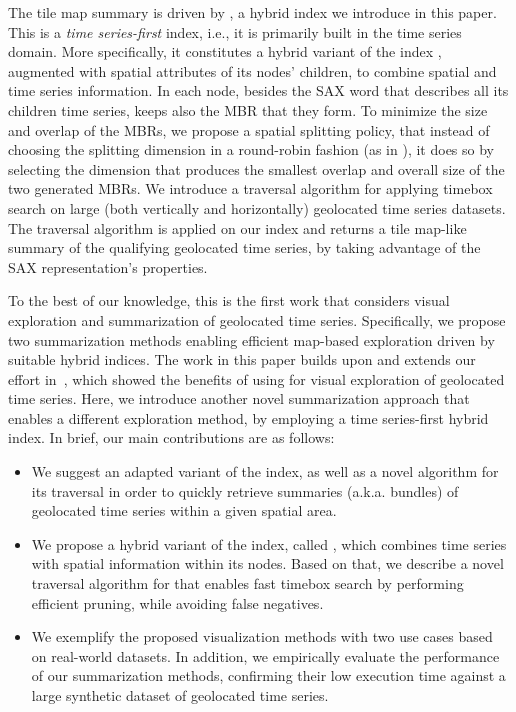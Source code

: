 The tile map summary is driven by \hisax, a hybrid index we introduce in this paper. This is a {\em time series-first} index, i.e., it is primarily built in the time series domain. More specifically, it constitutes a hybrid variant of the \isax index \cite{shieh2008kdd,camerra2010icdm,camerra2014kais}, augmented with spatial attributes of its nodes' children, to combine spatial and time series information. In each node, besides the SAX word that describes all its children time series, \hisax keeps also the MBR that they form. To minimize the size and overlap of the MBRs, we propose a spatial splitting policy, that instead of choosing the splitting dimension in a round-robin fashion (as in \isax), it does so by selecting the dimension that produces the smallest overlap and overall size of the two generated MBRs. We introduce a traversal algorithm for applying timebox search on large (both vertically and horizontally) geolocated time series datasets. The traversal algorithm is applied on our \hisax index and returns a tile map-like summary of the qualifying geolocated time series, by taking advantage of the SAX representation's properties.

To the best of our knowledge, this is the first work that considers visual exploration and summarization of geolocated time series. Specifically, we propose two summarization methods enabling efficient map-based exploration driven by suitable hybrid indices. The work in this paper builds upon and extends our effort in~\cite{chatzigeorgakidis2018map}, which showed the benefits of using \btsr for visual exploration of geolocated time series. Here, we introduce another novel summarization approach that enables a different exploration method, by employing a time series-first hybrid index. In brief, our main contributions are as follows:

\begin{itemize}
 \item We suggest an adapted variant of the \btsr index, as well as a novel algorithm for its traversal in order to quickly retrieve summaries (a.k.a. bundles) of geolocated time series within a given spatial area.
 \item We propose a hybrid variant of the \isax index, called \hisax, which combines time series with spatial information within its nodes. Based on that, we describe a novel traversal algorithm for \hisax that enables fast timebox search by performing efficient pruning, while avoiding false negatives.
 \item We exemplify the proposed visualization methods with two use cases based on real-world datasets. In addition, we empirically evaluate the performance of our summarization methods, confirming their low execution time against a large synthetic dataset of geolocated time series.
\end{itemize}

